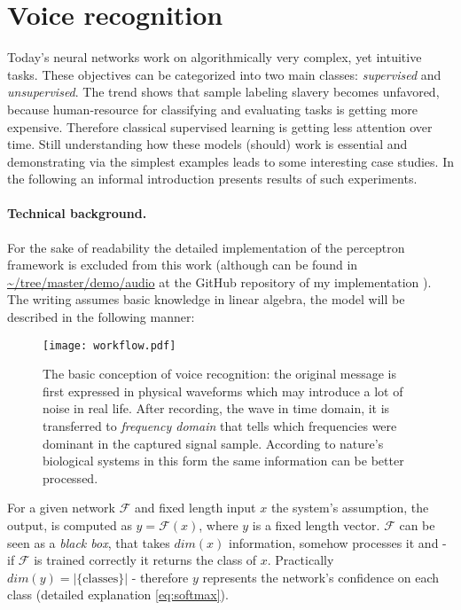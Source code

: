 \section{Voice recognition}\label{sec:voice}

Today's neural networks work on algorithmically very complex, yet 
intuitive tasks. These objectives can be categorized into two main 
classes: \emph{supervised} and \emph{unsupervised}. 
The trend shows that sample labeling slavery becomes unfavored, 
because human-resource for classifying and evaluating tasks is getting more expensive.
Therefore classical supervised learning is getting less attention over time. 
Still understanding how these models (should) work is essential and 
demonstrating via the simplest examples leads to some interesting case 
studies. In the following an informal introduction presents results of 
such experiments.

\paragraph{Technical background.} 
For the sake of readability the detailed implementation of the perceptron 
framework is excluded from this work (although can be found in 
\url{~/tree/master/demo/audio} at the GitHub repository of my implementation \cite{DV}). 
The writing assumes basic knowledge in linear algebra, the model will be described in the following manner:
 
\begin{figure}
	\centering
	\texttt{[image: workflow.pdf]}
	\caption{
	The basic conception of voice recognition: 
	the original message is first expressed in physical waveforms which may introduce a lot of noise in real life. 
	After recording, the wave in time domain, it is transferred to \emph{frequency domain} that 
	tells which frequencies were dominant in the captured signal sample.
	According to nature's biological systems in this form the same information can be better processed.
	}
	\label{fig:workflow}
\end{figure}
For a given network $\mathcal{F}$ and fixed length input $x$ the system's assumption, the output, is computed as $y=\mathcal{F}(x)$, where $y$ is a fixed length vector.
$\mathcal{F}$ can be seen as a \emph{black box}, that takes $dim(x)$ information, somehow processes it and - if $\mathcal{F}$ is trained correctly it returns the class of $x$. Practically $dim(y)=|\{\textrm{classes}\}|$ - therefore $y$ represents the network's confidence on each class (detailed explanation \ref{eq:softmax}). 

